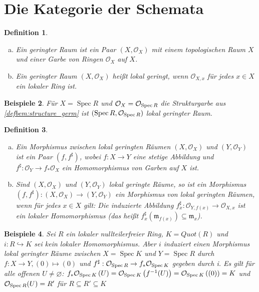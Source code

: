 \documentclass[a4paper,oneside]{scrbook}
\theoremstyle{break}
\newtheorem{Def}{Definition}[section]
\newtheorem{Bsp}[Def]{Beispiele}
\theoremstyle{nonumberbreak}
\theoremstyle{nonumberplain}
\theoremstyle{break}
\renewcommand{\emptyset}{%
	\ensuremath{\varnothing}%
}
\newcommand{\Spec}{%
	\ensuremath{\operatorname{Spec}}%
}
\begin{document}
\section{Die Kategorie der Schemata}

\begin{Def}
	\begin{enumerate}[(a)]
		\item Ein \emph{geringter Raum} ist ein Paar $\left( X, \mathcal{O}_X \right)$ mit einem topologischen Raum $X$ und einer Garbe von Ringen $\mathcal{O}_X$ auf $X$.
		\item Ein geringter Raum $\left( X, \mathcal{O}_X \right)$ heißt \emph{lokal geringt}, wenn $\mathcal{O}_{X,x}$ für jedes $x \in X$ ein lokaler Ring ist.
	\end{enumerate}
\end{Def}

\begin{Bsp}
 Für $X=\Spec R$ und $\mathcal{O}_X =\mathcal{O}_{\Spec R}$ die Strukturgarbe aus \ref{defbem:structure_germ} ist $\left( \Spec R,\mathcal{O}_{\Spec R} \right)$ lokal geringter Raum.
\end{Bsp}

\begin{Def}
	\begin{enumerate}[(a)]
		\item Ein Morphismus zwischen lokal geringten Räumen $\left( X, \mathcal{O}_X \right)$ und $\left( Y, \mathcal{O}_Y \right)$ ist ein Paar $\left( f, f^\sharp \right)$, wobei $f : X \rightarrow Y$ eine stetige Abbildung und $f^\sharp: \mathcal{O}_Y \rightarrow f_* \mathcal{O}_X$ ein Homomorphismus von Garben auf $X$ ist.
		\item Sind $\left( X, \mathcal{O}_X \right)$ und $\left( Y, \mathcal{O}_Y \right)$ lokal geringte Räume, so ist ein Morphismus $\left( f, f^\sharp \right) :\left( X, \mathcal{O}_X \right) \rightarrow \left( Y, \mathcal{O}_Y \right) $ ein Morphismus von lokal geringten Räumen, wenn für jedes $x \in X$ gilt: Die induzierte Abbildung $f^\sharp_x: \mathcal{O}_{Y,f(x)} \rightarrow  \mathcal{O}_{X,x}$ ist ein lokaler Homomorphismus (das heißt $f^\sharp_x \left( \mathfrak{m}_{f(x)}\right) \subseteq \mathfrak{m}_x$).
	\end{enumerate}
\end{Def}

\begin{Bsp}
	Sei $R$ ein lokaler nullteilerfreier Ring, $K=Quot(R)$ und $i: R \hookrightarrow K$ sei kein lokaler Homomorphismus. Aber $i$ induziert einen Morphismus lokal geringter Räume zwischen $X=\Spec K$ und $Y= \Spec R$ durch $f: X \rightarrow Y, (0) \mapsto (0)$ und $f^\sharp:\mathcal{O}_{\Spec R} \rightarrow f_* \mathcal{O}_{\Spec K} $ gegeben durch i. Es gilt für alle offenen $U \neq \emptyset$: $f_* \mathcal{O}_{\Spec K} \left( U \right) = \mathcal{O}_{\Spec K} \left( f^{-1}(U) \right) = \mathcal{O}_{\Spec K} \left( (0) \right) = K$ und $\mathcal{O}_{\Spec R}(U)=R'$ für $R \subseteq R' \subseteq K$
\end{Bsp}
\end{document}
